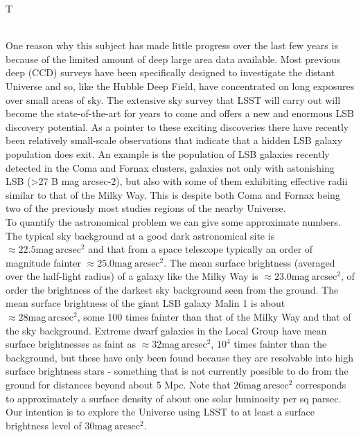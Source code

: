 \begin{tasklist}{T}
\begin{task}
{\\
One reason why this subject has made little progress over the last few years is because of the limited amount of deep large area data available. Most previous deep (CCD) surveys have been specifically designed to investigate the distant Universe and so, like the Hubble Deep Field, have concentrated on long exposures over small areas of sky. The extensive sky survey that LSST will carry out will become the state-of-the-art for years to come and offers a new and enormous LSB discovery potential. As a pointer to these exciting discoveries there have recently been relatively small-scale observations that indicate that a hidden LSB galaxy population does exit. An example is the population of LSB galaxies recently detected in the Coma and Fornax clusters, galaxies not only with astonishing LSB (>27 B mag arcsec-2), but also with some of them exhibiting effective radii similar to that of the Milky Way. This is despite both Coma and Fornax being two of the previously most studies regions of the nearby Universe.
\\
To quantify the astronomical problem we can give some approximate numbers. The typical sky background at a good dark astronomical site is $\approx22.5\mathrm{mag}~\mathrm{arcsec}^2$ and that from a space telescope typically an order of magnitude fainter $\approx25.0\mathrm{mag}~\mathrm{arcsec}^2$. The mean surface brightness (averaged over the half-light radius) of a galaxy like the Milky Way is $\approx23.0\mathrm{mag}~\mathrm{arcsec}^2$, of order the brightness of the darkest sky background seen from the ground. The mean surface brightness of the giant LSB galaxy Malin 1 is about $\approx28\mathrm{mag}~\mathrm{arcsec}^2$, some 100 times fainter than that of the Milky Way and that of the sky background. Extreme dwarf galaxies in the Local Group have mean surface brightnesses as faint as $\approx32\mathrm{mag}~\mathrm{arcsec}^2$, $10^4$ times fainter than the background, but these have only been found because they are resolvable into high surface brightness stars - something that is not currently possible to do from the ground for distances beyond about 5 Mpc. Note that $26\mathrm{mag}~\mathrm{arcsec}^2$ corresponds to approximately a surface density of about one solar luminosity per sq parsec. Our intention is to explore the Universe using LSST to at least a surface brightness level of $30\mathrm{mag}~\mathrm{arcsec}^2$.
}
\end{task}
\end{tasklist}
